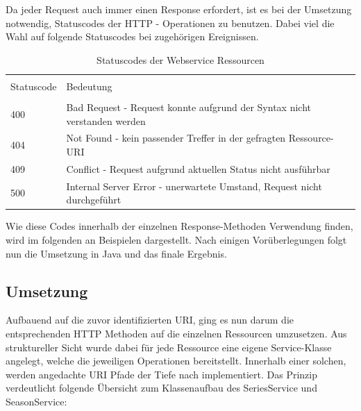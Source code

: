 \vspace{0.2cm}

Da jeder Request auch immer einen Response erfordert, ist es bei der Umsetzung notwendig, Statuscodes der HTTP - Operationen zu benutzen. Dabei viel die Wahl auf folgende Statuscodes bei zugehörigen Ereignissen.

\begin{table}[H]
\caption{Statuscodes der Webservice Ressourcen}

\centering
\begin{tabular}{l l l}
\\ [-0.5ex]

\hline\hline
\\ [-0.5ex]
Statuscode & Bedeutung
\\ [1.5ex]
\hline
\\ [-0.5ex]
400 & Bad Request - Request konnte aufgrund der Syntax nicht verstanden werden\\[1ex]
404 & Not Found - kein passender Treffer in der gefragten Ressource-URI \\[1ex]
409 & Conflict - Request aufgrund aktuellen Status nicht ausführbar\\[1ex]
500 & Internal Server Error - unerwartete Umstand, Request nicht durchgeführt\\[1ex]

\hline
\end{tabular}
\label{tab:statuscodes}
\end{table}

Wie diese Codes innerhalb der einzelnen Response-Methoden Verwendung finden, wird im folgenden an Beispielen dargestellt. Nach einigen Vorüberlegungen folgt nun die Umsetzung in Java und das finale Ergebnis.

\subsection{Umsetzung}

Aufbauend auf die zuvor identifizierten URI, ging es nun darum die entsprechenden HTTP Methoden auf die einzelnen Ressourcen umzusetzen. Aus struktureller Sicht wurde dabei für jede Ressource eine eigene Service-Klasse angelegt, welche die jeweiligen Operationen bereitstellt. Innerhalb einer solchen, werden angedachte URI Pfade der Tiefe nach implementiert. Das Prinzip verdeutlicht folgende Übersicht zum Klassenaufbau des SeriesService und SeasonService:

